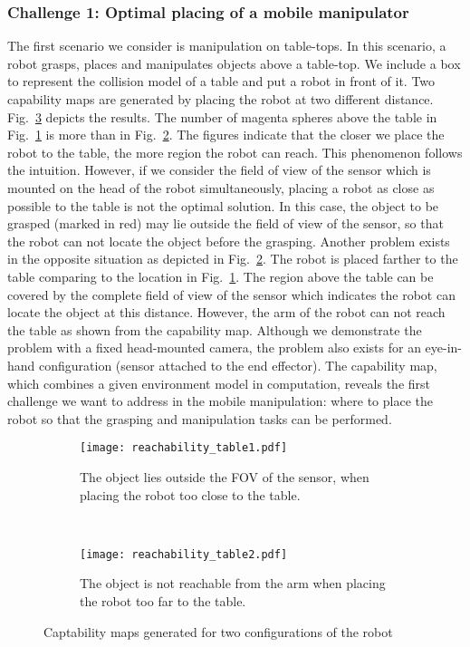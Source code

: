 \subsubsection{Challenge 1: Optimal placing of a mobile manipulator}

The first scenario we consider is manipulation on table-tops. In this scenario, a robot grasps, places and manipulates objects above a table-top. We include a box to represent the collision model of a table and put a robot in front of it. Two capability maps are generated by placing the robot at two different distance. Fig.~\ref{fig:cmap_tables} depicts the results. The number of magenta spheres above the table in Fig.~\ref{fig:cmap_table1} is more than in Fig.~\ref{fig:cmap_table2}. The figures indicate that the closer we place the robot to the table, the more region the robot can reach. This phenomenon follows the intuition. However, if we consider the field of view of the sensor which is mounted on the head of the robot simultaneously, placing a robot as close as possible to the table is not the optimal solution. In this case, the object to be grasped (marked in red) may lie outside the field of view of the sensor, so that the robot can not locate the object before the grasping. Another problem exists in the opposite situation as depicted in Fig.~\ref{fig:cmap_table2}. The robot is placed farther to the table comparing to the location in Fig.~\ref{fig:cmap_table1}. The region above the table can be covered by the complete field of view of the sensor which indicates the robot can locate the object at this distance. However, the arm of the robot can not reach the table as shown from the capability map. Although we demonstrate the problem with a fixed head-mounted camera, the problem also exists for an eye-in-hand configuration (sensor attached to the end effector). The capability map, which combines a given environment model in computation,  reveals the first challenge we want to address in the mobile manipulation: where to place the robot so that the grasping and manipulation tasks can be performed. 

\begin{figure}[!htbp]
    \centering
    \begin{subfigure}[b]{0.37\textwidth}
        \texttt{[image: reachability\_table1.pdf]}
        \caption{The object lies outside the FOV of the sensor, when placing the robot too close to the table.}
        \label{fig:cmap_table1}
    \end{subfigure}
    ~ %
    \begin{subfigure}[b]{0.45\textwidth}
        \texttt{[image: reachability\_table2.pdf]}
        \caption{The object is not reachable from the arm when placing the robot too far to the table.}
        \label{fig:cmap_table2}
    \end{subfigure}
    \caption{Captability maps generated for two configurations of the robot}\label{fig:cmap_tables}
\end{figure}

